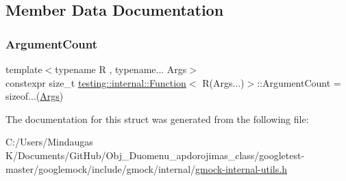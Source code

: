 \subsection{Member Data Documentation}
\mbox{\label{structtesting_1_1internal_1_1_function_3_01_r_07_args_8_8_8_08_4_a9fbf56d693d099df9f23ad175ccef781}} 
\subsubsection{\texorpdfstring{ArgumentCount}{ArgumentCount}}
{\footnotesize\ttfamily template$<$typename R , typename... Args$>$ \\
constexpr size\+\_\+t \mbox{\hyperlink{structtesting_1_1internal_1_1_function}{testing\+::internal\+::\+Function}}$<$ R(Args...)$>$\+::Argument\+Count = sizeof...(\mbox{\hyperlink{namespacetesting_aaca153f67b689b8b9d5b8c67ecf8cee4}{Args}})\hspace{0.3cm}{\ttfamily [static]}}



The documentation for this struct was generated from the following file\+:\begin{DoxyCompactItemize}
\item 
C\+:/\+Users/\+Mindaugas K/\+Documents/\+Git\+Hub/\+Obj\+\_\+\+Duomenu\+\_\+apdorojimas\+\_\+class/googletest-\/master/googlemock/include/gmock/internal/\mbox{\hyperlink{googletest-master_2googlemock_2include_2gmock_2internal_2gmock-internal-utils_8h}{gmock-\/internal-\/utils.\+h}}\end{DoxyCompactItemize}
